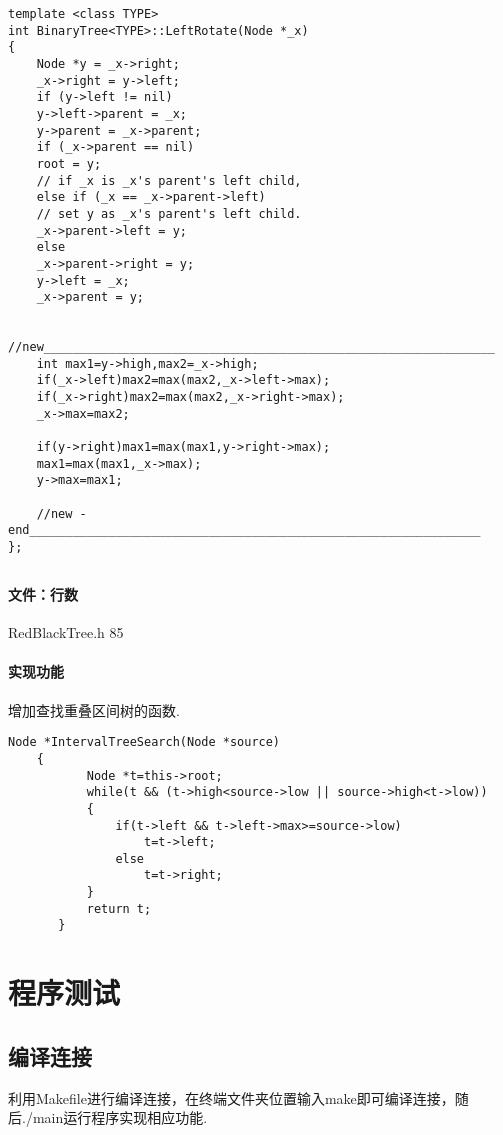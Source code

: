 \documentclass{article}
\begin{document}
\begin{lstlisting}
template <class TYPE>
int BinaryTree<TYPE>::LeftRotate(Node *_x)
{
    Node *y = _x->right;
    _x->right = y->left;
    if (y->left != nil)
	y->left->parent = _x;
    y->parent = _x->parent;
    if (_x->parent == nil)
	root = y;
    // if _x is _x's parent's left child,
    else if (_x == _x->parent->left)
	// set y as _x's parent's left child.
	_x->parent->left = y;
    else
	_x->parent->right = y;
    y->left = _x;
    _x->parent = y;
    
    //new_______________________________________________________________
    int max1=y->high,max2=_x->high;
    if(_x->left)max2=max(max2,_x->left->max);
    if(_x->right)max2=max(max2,_x->right->max);
    _x->max=max2;
    
    if(y->right)max1=max(max1,y->right->max);
    max1=max(max1,_x->max);
    y->max=max1;
    
    //new -end_______________________________________________________________
};
\end{lstlisting}

\subsection{}
\paragraph{文件：行数}
RedBlackTree.h		85
\paragraph{实现功能}
增加查找重叠区间树的函数.
\begin{lstlisting}
Node *IntervalTreeSearch(Node *source)
    {
           Node *t=this->root;
           while(t && (t->high<source->low || source->high<t->low))
           {
               if(t->left && t->left->max>=source->low)
                   t=t->left;
               else
                   t=t->right;
           }
           return t;
       }
\end{lstlisting}



\section{程序测试}
\subsection{编译连接}
利用Makefile进行编译连接，在终端文件夹位置输入make即可编译连接，随后./main运行程序实现相应功能.
\end{document}
